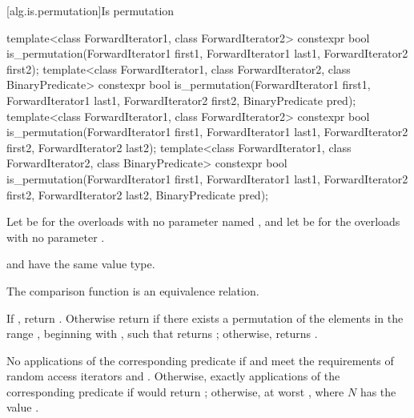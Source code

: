 [alg.is.permutation]{Is permutation}

%
\begin{itemdecl}
template<class ForwardIterator1, class ForwardIterator2>
  constexpr bool is_permutation(ForwardIterator1 first1, ForwardIterator1 last1,
                                ForwardIterator2 first2);
template<class ForwardIterator1, class ForwardIterator2,
         class BinaryPredicate>
  constexpr bool is_permutation(ForwardIterator1 first1, ForwardIterator1 last1,
                                ForwardIterator2 first2, BinaryPredicate pred);
template<class ForwardIterator1, class ForwardIterator2>
  constexpr bool is_permutation(ForwardIterator1 first1, ForwardIterator1 last1,
                                ForwardIterator2 first2, ForwardIterator2 last2);
template<class ForwardIterator1, class ForwardIterator2,
         class BinaryPredicate>
  constexpr bool is_permutation(ForwardIterator1 first1, ForwardIterator1 last1,
                                ForwardIterator2 first2, ForwardIterator2 last2,
                                BinaryPredicate pred);
\end{itemdecl}

\begin{itemdescr}
\pnum
Let  be 
for the overloads with no parameter named ,
and let  be 
for the overloads with no parameter .

\pnum
\mandates
{} and  have the same value type.

\pnum
\expects
The comparison function is an equivalence relation.

\pnum
\returns
If , return .
Otherwise return 
if there exists a permutation of the elements
in the range ,
beginning with ,
such that  returns ;
otherwise, returns .

\pnum
\complexity
No applications of the corresponding predicate
if  and 
meet the requirements of random access iterators and
.
Otherwise, exactly  applications
of the corresponding predicate
if  would return ;
otherwise, at worst , where $N$ has the value .
\end{itemdescr}

